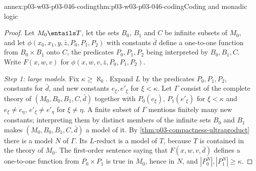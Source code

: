 \begin{annexitem}{annex:p03-w03-p03-046-coding}{thm:p03-w03-p03-046-coding}{Coding and monadic logic}
\begin{proof}
Let \(M_0\entails T\), let the sets \(B_0\), \(B_1\) and \(C\) be infinite
subsets of \(M_0\), and let
\(\phi(x_0,x_1,y,\bar z,P_0,P_1,P_2)\) with constants \(\bar d\) define a
one-to-one function from \(B_0\times B_1\) onto \(C\), the predicates
\(P_0,P_1,P_2\) being interpreted by \(B_0,B_1,C\). Write
\(F(x,w,v)\) for \(\phi(x,w,v,\bar z,P_0,P_1,P_2)\).

\emph{Step 1: large models.} Fix \(\kappa\ge\aleph_0\). Expand \(L\) by the
predicates \(P_0,P_1,P_2\), constants for \(\bar d\), and new constants
\(e_\xi,e'_\xi\) for \(\xi<\kappa\). Let \(\Gamma\) consist of the complete
theory of \((M_0,B_0,B_1,C,\bar d)\) together with \(P_0(e_\xi)\),
\(P_1(e'_\xi)\) for \(\xi<\kappa\) and \(e_\xi\neq e_\eta\),
\(e'_\xi\neq e'_\eta\) for \(\xi\neq\eta\). A finite subset of \(\Gamma\)
mentions finitely many new constants; interpreting them by distinct members
of the infinite sets \(B_0\) and \(B_1\) makes \((M_0,B_0,B_1,C,\bar d)\) a
model of it. By \cref{thm:p03-compactness-ultraproduct} there is a model \(N\) of
\(\Gamma\). Its \(L\)-reduct is a model of \(T\), because \(T\) is
contained in the theory of \(M_0\). The first-order sentence saying that
\(F(x,w,v,\bar d)\) defines a one-to-one function from
\(P_0\times P_1\) is true in \(M_0\), hence in \(N\), and
\(|P_0^N|,|P_1^N|\ge\kappa\).


\end{proof}
\end{annexitem}
